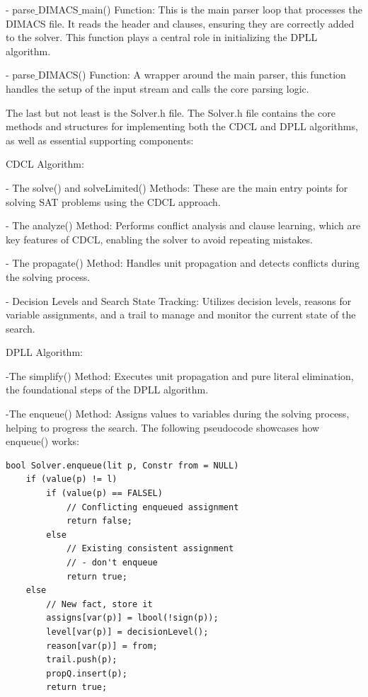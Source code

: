 \documentclass[runningheads]{llncs}
\begin{document}
- parse$\_$DIMACS$\_$main() Function: This is the main parser loop that processes the DIMACS file. It reads the header and clauses, ensuring they are correctly added to the solver. This function plays a central role in initializing the DPLL algorithm.

- parse$\_$DIMACS() Function: A wrapper around the main parser, this function handles the setup of the input stream and calls the core parsing logic.

The last but not least is the Solver.h file.
The Solver.h file contains the core methods and structures for implementing both the \ac{CDCL} and \ac{DPLL} algorithms, as well as essential supporting components:

\ac{CDCL} Algorithm:

- The solve() and solveLimited() Methods: These are the main entry points for solving SAT problems using the CDCL approach.

- The analyze() Method: Performs conflict analysis and clause learning, which are key features of CDCL, enabling the solver to avoid repeating mistakes.

- The propagate() Method: Handles unit propagation and detects conflicts during the solving process.

- Decision Levels and Search State Tracking: Utilizes decision levels, reasons for variable assignments, and a trail to manage and monitor the current state of the search.

\ac{DPLL} Algorithm:

-The simplify() Method: Executes unit propagation and pure literal elimination, the foundational steps of the DPLL algorithm.

-The enqueue() Method: Assigns values to variables during the solving process, helping to progress the search. The following pseudocode\cite{sat-solver} showcases how enqueue() works:

\begin{lstlisting}
bool Solver.enqueue(lit p, Constr from = NULL)
    if (value(p) != l)
        if (value(p) == FALSEL)
            // Conflicting enqueued assignment
            return false;
        else
            // Existing consistent assignment 
            // - don't enqueue
            return true;
    else
        // New fact, store it
        assigns[var(p)] = lbool(!sign(p));
        level[var(p)] = decisionLevel();
        reason[var(p)] = from;
        trail.push(p);
        propQ.insert(p);
        return true;
\end{lstlisting}
\end{document}

